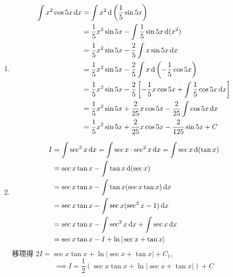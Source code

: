 \begin{solution}
\begin{enumerate}
        \item %
              \begin{align*}
                  \int x^2 \cos 5x \operatorname{d\!} x & = \int x^2 \operatorname{d}\left(\frac{1}{5} \sin 5x \right)                                                               \\
                                          & = \frac{1}{5} x^2 \sin 5x - \int \frac{1}{5} \sin 5x \operatorname{d}(x^2)                                                 \\
                                          & = \frac{1}{5} x^2 \sin 5x - \frac{2}{5} \int x \sin 5x \operatorname{d\!} x                                                   \\
                                          & = \frac{1}{5} x^2 \sin 5x - \frac{2}{5} \int x \operatorname{d}\left(-\frac{1}{5} \cos 5x \right)                          \\
                                          & = \frac{1}{5} x^2 \sin 5x - \frac{2}{5} \left[ -\frac{1}{5} x \cos 5x + \int \frac{1}{5} \cos 5x \operatorname{d\!} x \right] \\
                                          & = \frac{1}{5} x^2 \sin 5x + \frac{2}{25} x \cos 5x - \frac{2}{25} \int \cos 5x \operatorname{d\!} x                           \\
                                          & = \frac{1}{5} x^2 \sin 5x + \frac{2}{25} x \cos 5x - \frac{2}{125} \sin 5x + C
              \end{align*}

        \item %
              \begin{align*}
                  I & = \int \sec^3 x \operatorname{d\!} x = \int \sec x \cdot \sec^2 x \operatorname{d\!} x = \int \sec x \operatorname{d}(\tan x) \\
                    & = \sec x \tan x - \int \tan x \operatorname{d}(\sec x)                                            \\
                    & = \sec x \tan x - \int \tan x (\sec x \tan x) \operatorname{d\!} x                                   \\
                    & = \sec x \tan x - \int \sec x (\sec^2 x - 1) \operatorname{d\!} x                                    \\
                    & = \sec x \tan x - \int \sec^3 x \operatorname{d\!} x + \int \sec x \operatorname{d\!} x                            \\
                    & = \sec x \tan x - I + \ln|\sec x + \tan x|
              \end{align*}
              移项得 $2I = \sec x \tan x + \ln|\sec x + \tan x| + C_1$,
              $$ \implies I = \frac{1}{2}(\sec x \tan x + \ln|\sec x + \tan x|) + C $$


\end{enumerate}
\end{solution}
